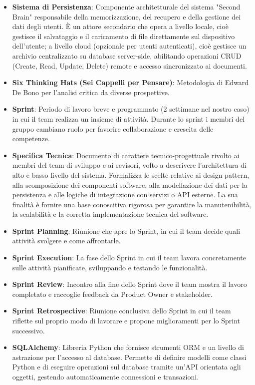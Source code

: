 \documentclass[11pt,a4paper]{article}
\begin{document}
\begin{itemize}
\item \textbf{Sistema di Persistenza}: Componente architetturale del sistema "Second Brain" responsabile della memorizzazione, del recupero e della gestione dei dati degli utenti. È un attore secondario che opera a livello locale, cioè gestisce il salvataggio e il caricamento di file direttamente sul dispositivo dell'utente; a livello cloud (opzionale per utenti autenticati), cioè gestisce un archivio centralizzato su database server-side, abilitando operazioni CRUD (Create, Read, Update, Delete) remote e accesso sincronizzato ai documenti.

\item \textbf{Six Thinking Hats (Sei Cappelli per Pensare)}: Metodologia di Edward De Bono per l'analisi critica da diverse prospettive.
\item \textbf{Sprint}: Periodo di lavoro breve e programmato (2 settimane nel nostro caso) in cui il team realizza un insieme di attività. Durante lo sprint i membri del gruppo cambiano ruolo per favorire collaborazione e crescita delle competenze.

\item \textbf{Specifica Tecnica}: Documento di carattere tecnico-progettuale rivolto ai membri del team di sviluppo e ai revisori, volto a descrivere l'architettura di alto e basso livello del sistema. Formalizza le scelte relative ai design pattern, alla scomposizione dei componenti software, alla modellazione dei dati per la persistenza e alle logiche di 
integrazione con servizi o API esterne. La sua finalità è fornire una base conoscitiva rigorosa per garantire la manutenibilità, la scalabilità e la corretta implementazione tecnica del software.

\item \textbf{Sprint Planning}: Riunione che apre lo Sprint, in cui il team decide quali attività svolgere e come affrontarle.
\item \textbf{Sprint Execution}: La fase dello Sprint in cui il team lavora concretamente sulle attività pianificate, sviluppando e testando le funzionalità.
\item \textbf{Sprint Review}: Incontro alla fine dello Sprint dove il team mostra il lavoro completato e raccoglie feedback da Product Owner e stakeholder.
\item \textbf{Sprint Retrospective}: Riunione conclusiva dello Sprint in cui il team riflette sul proprio modo di lavorare e propone miglioramenti per lo Sprint successivo.

\item \textbf{SQLAlchemy}: Libreria Python che fornisce strumenti ORM 
e un livello di astrazione per l'accesso al database. Permette 
di definire modelli come classi Python e di eseguire operazioni 
sul database tramite un'API orientata agli oggetti, gestendo 
automaticamente connessioni e transazioni.


\end{itemize}
\end{document}
